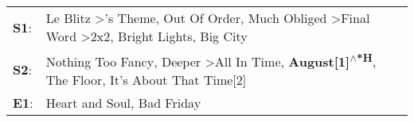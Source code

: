 \begin{supertabular}{p{0.03\textwidth}p{0.92\textwidth}}
 \textbf{S1}:  &  Le Blitz\textsuperscript{} \textgreater {}'s Theme\textsuperscript{}, \enspace Out Of Order\textsuperscript{}, \enspace Much Obliged\textsuperscript{} \textgreater \enspace Final Word\textsuperscript{} \textgreater \enspace 2x2\textsuperscript{}, \enspace Bright Lights, Big City\textsuperscript{}  \enspace  \\
 \textbf{S2}:  &                                       Nothing Too Fancy\textsuperscript{}, \enspace Deeper\textsuperscript{} \textgreater \enspace All In Time\textsuperscript{}, \enspace \textbf{August[1]\textsuperscript{$\wedge$*H}}, \enspace The Floor\textsuperscript{}, \enspace It's About That Time[2]\textsuperscript{}  \enspace  \\
 \textbf{E1}:  &                                                                                                                                                                                                                                             Heart and Soul\textsuperscript{}, \enspace Bad Friday\textsuperscript{}  \enspace  \\
\end{supertabular}
